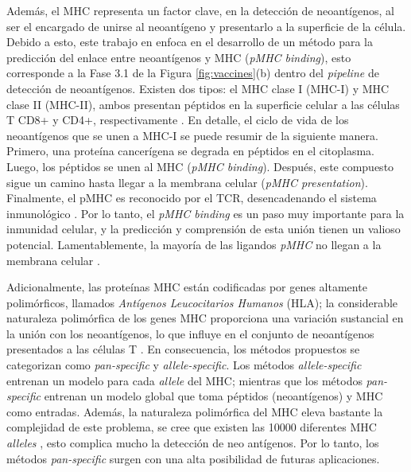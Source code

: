 Además, el MHC representa un factor clave, en la detección de neoantígenos, al ser el encargado de unirse al neoantígeno y presentarlo a la superficie de la célula. Debido a esto, este trabajo en enfoca en el desarrollo de un método para la predicción del enlace entre neoantígenos y MHC (\textit{pMHC binding}), esto corresponde a la Fase 3.1 de la Figura \ref{fig:vaccines}(b) dentro del \textit{pipeline} de detección de neoantígenos.  Existen dos tipos: el MHC clase I (MHC-I) y MHC clase II (MHC-II), ambos presentan péptidos en la superficie celular a las células T CD8+ y CD4+, respectivamente \citep{janeway1997immunobiology, abualrous2021major}. En detalle, el ciclo de vida de los neoantígenos que se unen a MHC-I se puede resumir de la siguiente manera. Primero, una proteína cancerígena se degrada en péptidos en el citoplasma. Luego, los péptidos se unen al MHC (\textit{pMHC binding}). Después, este compuesto sigue un camino hasta llegar a la membrana celular (\textit{pMHC presentation}). Finalmente, el pMHC es reconocido por el TCR, desencadenando el sistema inmunológico \citep{janeway1997immunobiology, wieczorek2017major, gasser2021interpreting}. Por lo tanto, el \textit{pMHC binding} es un paso muy importante para la inmunidad celular, y la predicción y comprensión de esta unión tienen un valioso potencial. Lamentablemente, la mayoría de las ligandos \textit{pMHC} no llegan a la membrana celular \citep{de2020neoantigen}. 

Adicionalmente, las proteínas MHC están codificadas por genes altamente polimórficos, llamados \textit{Antígenos Leucocitarios Humanos} (HLA); la considerable naturaleza polimórfica de los genes MHC proporciona una variación sustancial en la unión con los neoantígenos, lo que influye en el conjunto de neoantígenos presentados a las células T \citep{abualrous2021major}. En consecuencia, los métodos propuestos se categorizan como \textit{pan-specific} y \textit{allele-specific}. Los métodos \textit{allele-specific} \citep{rammensee1999syfpeithi, reche2002prediction, kim2009derivation, nielsen2016netmhcpan, vang2017hla, shao2020high, bravi2021rbm} entrenan un modelo para cada \textit{allele} del MHC; mientras que los métodos \textit{pan-specific} \citep{hu2019acme, liu2019deepseqpan, wu2019deephlapan, phloyphisut2019mhcseqnet, o2018mhcflurry, o2020mhcflurry, reynisson2020netmhcpan, venkatesh2020mhcattnnet, ye2021mathla, mei2021anthem, chu2022transformer, zhang2022hlab, mei2021anthem, hu2019acme, gfeller2023improved} entrenan un modelo global que toma péptidos (neoantígenos) y MHC como entradas. Además, la naturaleza polimórfica del MHC eleva bastante la complejidad de este problema, se cree que existen las 10000 diferentes MHC \textit{alleles} \citep{abelin2017mass}, esto complica mucho la detección de neo antígenos. Por lo tanto, los métodos \textit{pan-specific} surgen con una alta posibilidad de futuras aplicaciones.

